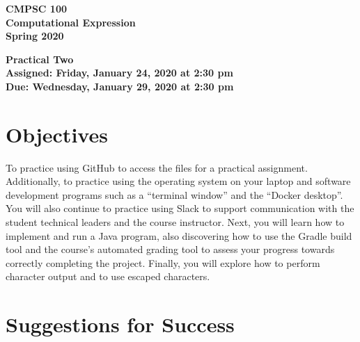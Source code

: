 \documentclass[11pt]{article}
\newcommand{\assignmentduedate}{January 29}
\newcommand{\assignmentassignedate}{January 24}
\newcommand{\assignmentnumber}{Two}
\newcommand{\labyear}{2020}
\newcommand{\labdueday}{Wednesday}
\newcommand{\labassignday}{Friday}
\newcommand{\labtime}{2:30 pm}
\newcommand{\assigneddate}{Assigned: \labassignday, \assignmentassignedate, \labyear{} at \labtime{}}
\newcommand{\duedate}{Due: \labdueday, \assignmentduedate, \labyear{} at \labtime{}}
\newcommand{\labtitle}[1]
{
  \begin{center}
    \begin{center}
      \bf
      CMPSC 100\\Computational Expression\\
      Spring 2020\\
      \medskip
    \end{center}
    \bf
    #1
  \end{center}
}
\begin{document}
\thispagestyle{empty}

\labtitle{Practical \assignmentnumber{} \\ \assigneddate{} \\ \duedate{}}

\section*{Objectives}

To practice using GitHub to access the files for a practical assignment.
Additionally, to practice using the operating system on your laptop and software
development programs such as a ``terminal window'' and the ``Docker desktop''.
You will also continue to practice using Slack to support communication with the
student technical leaders and the course instructor. Next, you will learn how to
implement and run a Java program, also discovering how to use the Gradle build
tool and the course's automated grading tool to assess your progress towards
correctly completing the project. Finally, you will explore how to perform
character output and to use escaped characters.

\section*{Suggestions for Success}
\end{document}
